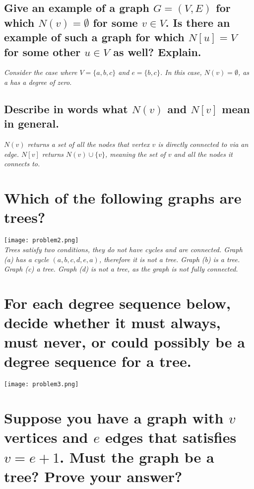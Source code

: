\documentclass{article}
\begin{document}
\subsection{Give an example of a graph $G=(V,E)$ for which $N(v) = \emptyset$ for some $v\in V$. Is there an example of such a graph for which $N[u]=V$ for some other $u\in V$ as well? Explain.}
\hspace{1cm}\textit{Consider the case where $V=\{a,b,c\}$ and $e=\{b,c\}$. In this case, $N(v)=\emptyset$, as a has a degree of zero.}
\subsection{Describe in words what $N(v)$ and $N[v]$ mean in general.}
\hspace{1cm}\textit{$N(v)$ returns a set of all the nodes that vertex $v$ is directly connected to via an edge. $N[v]$ returns $N(v)\cup\{v\}$, meaning the set of $v$ and all the nodes it connects to.}
\clearpage


\section{Which of the following graphs are trees?}
\texttt{[image: problem2.png]} \\

\hspace{1cm}\textit{Trees satisfy two conditions, they do not have cycles and are connected. Graph (a) has a cycle $(a,b,c,d,e,a)$, therefore it is not a tree. Graph (b) is a tree. Graph (c) a tree. Graph (d) is not a tree, as the graph is not fully connected.}




\section{For each degree sequence below, decide whether it must always, must never, or could possibly be a degree sequence for a tree.}
\hspace{1cm}\texttt{[image: problem3.png]}


\section{Suppose you have a graph with $v$ vertices and $e$ edges that satisfies $v=e+1$. Must the graph be a tree? Prove your answer?}
\end{document}
